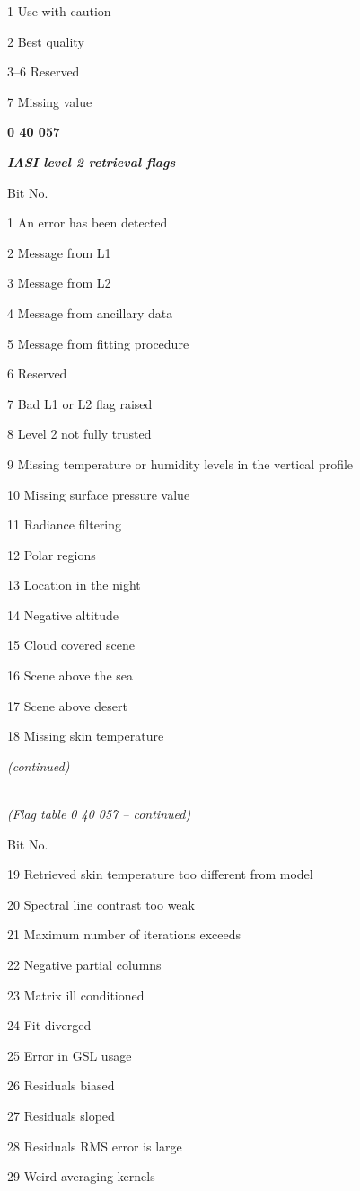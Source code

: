1 Use with caution

2 Best quality

3--6 Reserved

7 Missing value

\textbf{0 40 057}

\emph{\textbf{IASI level 2 retrieval flags}}

Bit No.

1 An error has been detected

2 Message from L1

3 Message from L2

4 Message from ancillary data

5 Message from fitting procedure

6 Reserved

7 Bad L1 or L2 flag raised

8 Level 2 not fully trusted

9 Missing temperature or humidity levels in the vertical profile

10 Missing surface pressure value

11 Radiance filtering

12 Polar regions

13 Location in the night

14 Negative altitude

15 Cloud covered scene

16 Scene above the sea

17 Scene above desert

18 Missing skin temperature

\emph{(continued)}

\emph{\\
(Flag table 0 40 057 -- continued)}

Bit No.

19 Retrieved skin temperature too different from model

20 Spectral line contrast too weak

21 Maximum number of iterations exceeds

22 Negative partial columns

23 Matrix ill conditioned

24 Fit diverged

25 Error in GSL usage

26 Residuals biased

27 Residuals sloped

28 Residuals RMS error is large

29 Weird averaging kernels

